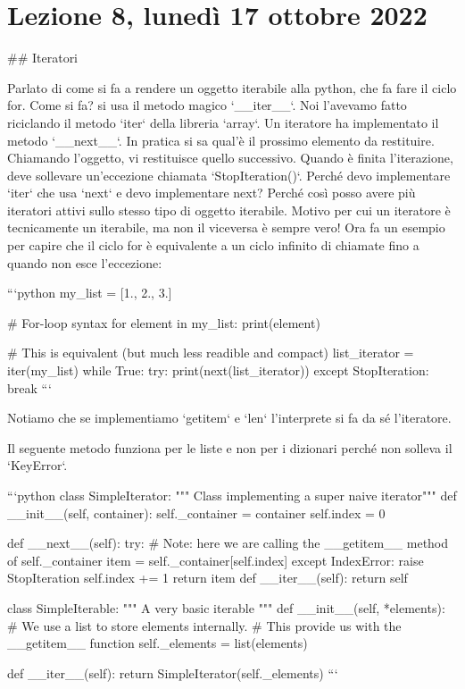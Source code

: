 \documentclass[10pt, a4paper, twosided, titlepage, draft]{book}
\begin{document}
\section{Lezione 8, lunedì 17 ottobre 2022}

## Iteratori

Parlato di come si fa a rendere un oggetto iterabile alla python, che fa fare il ciclo for. Come si fa? si usa il metodo magico `__iter__`. Noi l'avevamo fatto riciclando il metodo `iter` della libreria `array`.
Un iteratore ha implementato il metodo `__next__`. In pratica si sa qual'è il prossimo elemento da restituire. Chiamando l'oggetto, vi restituisce quello successivo. Quando è finita l'iterazione, deve sollevare un'eccezione chiamata `StopIteration()`.
Perché devo implementare `iter` che usa `next` e devo implementare next? Perché così posso avere più iteratori attivi sullo stesso tipo di oggetto iterabile.
Motivo per cui un iteratore è tecnicamente un iterabile, ma non il viceversa è sempre vero!
Ora fa un esempio per capire che il ciclo for è equivalente a un ciclo infinito di chiamate fino a quando non esce l'eccezione:

```python
my_list = [1., 2., 3.]

# For-loop syntax
for element in my_list:
print(element)

# This is equivalent (but much less readible and compact)
list_iterator = iter(my_list)
while True:
try:
print(next(list_iterator))
except StopIteration:
break
```

Notiamo che se implementiamo `getitem` e `len` l'interprete si fa da sé l'iteratore.

Il seguente metodo funziona per le liste e non per i dizionari perché non solleva il `KeyError`.

```python
class SimpleIterator:
""" Class implementing a super naive iterator"""
def __init__(self, container):
self._container = container
self.index = 0

def __next__(self):
try:
# Note: here we are calling the __getitem__ method of self._container
item = self._container[self.index]
except IndexError:
raise StopIteration
self.index += 1
return item
def __iter__(self):
return self

class SimpleIterable:
""" A very basic iterable """
def __init__(self, *elements):
# We use a list to store elements internally.
# This provide us with the __getitem__ function
self._elements = list(elements)

def __iter__(self):
return SimpleIterator(self._elements)
```
\end{document}
